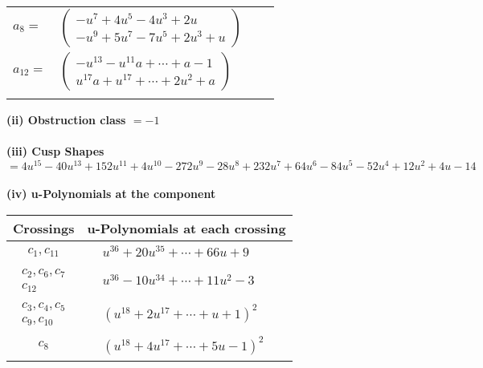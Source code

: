 \documentclass[1p]{elsarticle_modified}
\theoremstyle{definition}
\begin{document}
\begin{tabular}{m{7pt} m{180pt} m{7pt} m{180pt} }
\flushright $a_{8}=$&$\begin{pmatrix}- u^7+4 u^5-4 u^3+2 u\\- u^9+5 u^7-7 u^5+2 u^3+u\end{pmatrix}$ \\
\flushright $a_{12}=$&$\begin{pmatrix}- u^{13}- u^{11} a+\cdots+a-1\\u^{17} a+u^{17}+\cdots+2 u^2+a\end{pmatrix}$\\&\end{tabular}
\flushleft \textbf{(ii) Obstruction class $= -1$}\\~\\
\flushleft \textbf{(iii) Cusp Shapes $= 4 u^{15}-40 u^{13}+152 u^{11}+4 u^{10}-272 u^9-28 u^8+232 u^7+64 u^6-84 u^5-52 u^4+12 u^2+4 u-14$}\\~\\
\newpage\renewcommand{\arraystretch}{1}
\flushleft \textbf{(iv) u-Polynomials at the component}\newline \\
\begin{tabular}{m{50pt}|m{274pt}}
Crossings & \hspace{64pt}u-Polynomials at each crossing \\
\hline $$\begin{aligned}c_{1},c_{11}\end{aligned}$$&$\begin{aligned}
&u^{36}+20 u^{35}+\cdots+66 u+9
\end{aligned}$\\
\hline $$\begin{aligned}c_{2},c_{6},c_{7}\\c_{12}\end{aligned}$$&$\begin{aligned}
&u^{36}-10 u^{34}+\cdots+11 u^2-3
\end{aligned}$\\
\hline $$\begin{aligned}c_{3},c_{4},c_{5}\\c_{9},c_{10}\end{aligned}$$&$\begin{aligned}
&(u^{18}+2 u^{17}+\cdots+u+1)^{2}
\end{aligned}$\\
\hline $$\begin{aligned}c_{8}\end{aligned}$$&$\begin{aligned}
&(u^{18}+4 u^{17}+\cdots+5 u-1)^{2}
\end{aligned}$\\
\hline
\end{tabular}\\~\\
\end{document}
